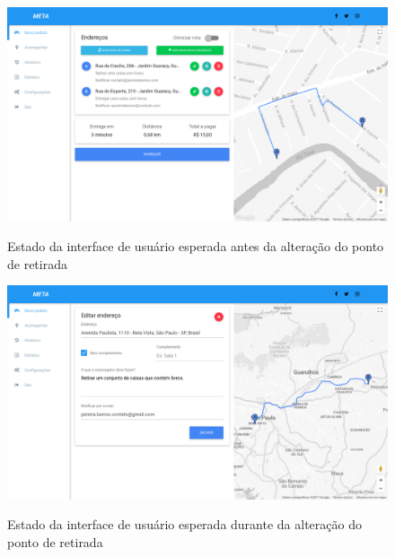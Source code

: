 \begin{apendicesenv}
		\begin{figure}[!h]
			\centering
			\caption{Estado da interface de usuário esperada antes da alteração do ponto de retirada}
			\includegraphics[width=1\textwidth]{./img/depois-entrega}
			\label{fig:antes-alterar}
		\end{figure}
		
		\begin{figure}[!h]
			\centering
			\caption{Estado da interface de usuário esperada durante da alteração do ponto de retirada}
			\includegraphics[width=1\textwidth]{./img/durante-alterar}
			\label{fig:durante-alterar}
		\end{figure}
		

\end{apendicesenv}
